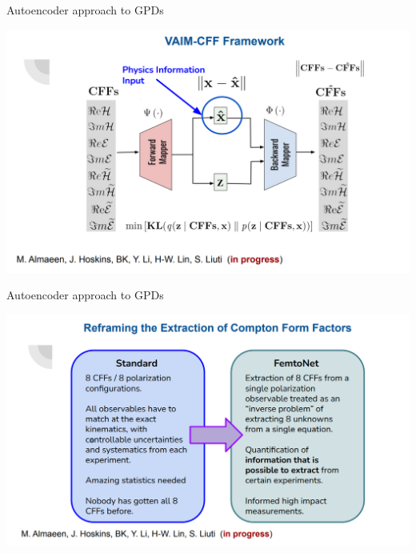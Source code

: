 \documentclass[aspectratio=169]{beamer}
\begin{document}
\begin{frame}{Autoencoder approach to GPDs}

  \includegraphics[scale=0.52832]{janres/vain1.png}
\end{frame}


\begin{frame}{Autoencoder approach to GPDs}

  \includegraphics[scale=0.52832]{janres/vain2.png}
\end{frame}


%
%
%
\end{document}
